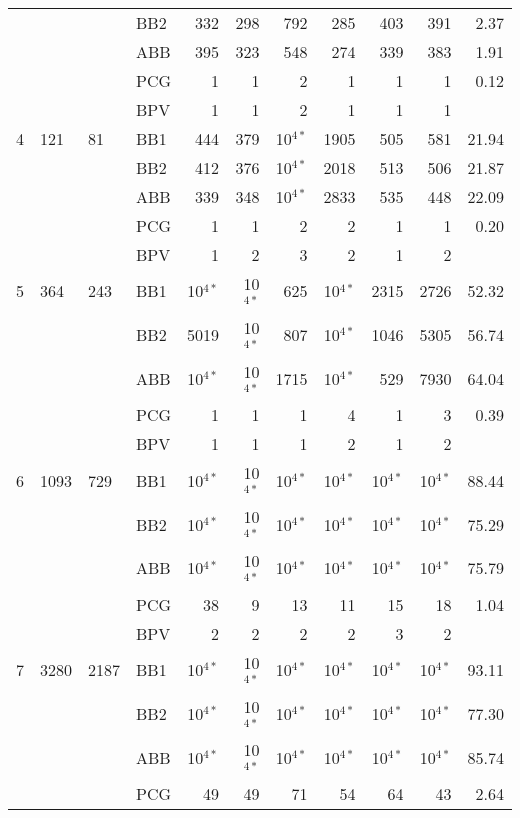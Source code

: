 \documentclass[11pt]{article}
\newcommand{\0}{\phantom{0}}
\begin{document}
\begin{table}[ht]
\begin{threeparttable}
\begin{tabular}{llllrrrrrrr}
			& & & BB2 & 332 & 298 & 792 & 285 & 403 & 391 & 2.37 \\
			& & & ABB & 395 & 323 & 548 & 274 & 339 & 383 & 1.91 \\
			& & & PCG & 1 & 1 & 2 & 1 & 1 & 1 & 0.12 \\	
			& & & BPV & 1 & 1 & 2 & 1 & 1 & 1 & \pmb{$0.09$} \\
			\midrule		
			4 & 121 & 81 & BB1 & 444 & 379 & 10$^{4*}$ & 1905 & 505 & 581 & 21.94 \\
			& & & BB2 & 412 & 376 & 10$^{4*}$ & 2018 & 513 & 506 & 21.87 \\
			& & & ABB & 339 & 348 & 10$^{4*}$ & 2833 & 535 & 448 & 22.09 \\
			& & & PCG & 1 & 1 & 2 & 2 & 1 & 1 & 0.20 \\
			& & & BPV & 1 & 2 & 3 & 2 & 1 & 2 & \pmb{$0.12$} \\
			\midrule
			5 & 364 & 243 & BB1 & 10$^{4*}$ & 10$^{4*}$ & 625 & 10$^{4*}$ & 2315 & 2726 & 52.32 \\
			& & & BB2 & 5019 & 10$^{4*}$ & 807 & 10$^{4*}$ & 1046 & 5305 & 56.74 \\
			& & & ABB & 10$^{4*}$ & 10$^{4*}$ & 1715 & 10$^{4*}$ & 529 & 7930 & 64.04 \\
			& & & PCG & 1 & 1 & 1 & 4 & 1 & 3 & 0.39 \\	
			& & & BPV & 1 & 1 & 1 & 2 & 1 & 2 & \pmb{$0.12$} \\ 
			\midrule		
			6 & 1093 & 729 & BB1 & 10$^{4*}$ & 10$^{4*}$ & 10$^{4*}$ & 10$^{4*}$ & 10$^{4*}$ & 10$^{4*}$ & 88.44 \\
			& & & BB2 & 10$^{4*}$ & 10$^{4*}$ & 10$^{4*}$ & 10$^{4*}$ & 10$^{4*}$ & 10$^{4*}$ & 75.29 \\
			& & & ABB & 10$^{4*}$ & 10$^{4*}$ & 10$^{4*}$ & 10$^{4*}$ & 10$^{4*}$ & 10$^{4*}$ & 75.79\\
			& & & PCG & 38 & 9 & 13 & 11 & 15 & 18 & 1.04 \\
			& & & BPV & 2 & 2 & 2 & 2 & 3 & 2 & \pmb{$0.19$} \\
			\midrule
			7 & 3280 & 2187 & BB1 & 10$^{4*}$ & 10$^{4*}$ & 10$^{4*}$ & 10$^{4*}$ & 10$^{4*}$ & 10$^{4*}$ & 93.11 \\
			& & & BB2 & 10$^{4*}$ & 10$^{4*}$ & 10$^{4*}$ & 10$^{4*}$ & 10$^{4*}$ & 10$^{4*}$ & 77.30 \\
			& & & ABB & 10$^{4*}$ & 10$^{4*}$ & 10$^{4*}$ & 10$^{4*}$ & 10$^{4*}$ & 10$^{4*}$ & 85.74 \\
			& & & PCG & 49 & 49 & 71 & 54 & 64 & 43 & 2.64 \\

\end{tabular}
\end{threeparttable}
\end{table}
\end{document}
